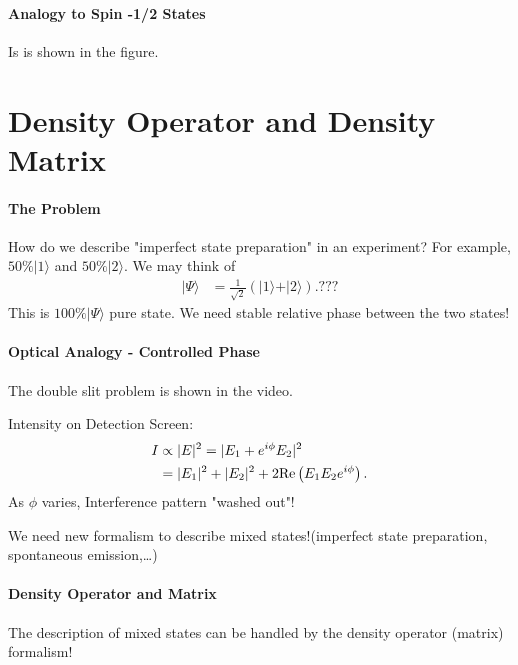 \documentclass[../../note.tex]{subfiles}
\begin{document}
\paragraph{Analogy to Spin -1/2 States}
Is is shown in the figure.

\section{Density Operator and Density Matrix}
\paragraph{The Problem}
How do we describe "imperfect state preparation" in an experiment? For example, $50 \% \vert 1 \rangle$ and $50 \% \vert 2 \rangle$. We may think of 
\begin{align}
    \vert \Psi \rangle 
    &= \frac{1}{\sqrt{2}} \left(\vert 1 \rangle + \vert 2 \rangle \right). ???
\end{align}
This is $100 \% \vert \Psi \rangle$ pure state. We need stable relative phase between the two states!

\paragraph{Optical Analogy - Controlled Phase}
The double slit problem is shown in the video.

Intensity on Detection Screen:
\begin{align}
    I 
    &\propto \vert E \vert^2 = \vert E_1 + e^{i \phi} E_2 \vert^2 \\
    &= \vert E_1 \vert^2 + \vert E_2 \vert^2 + 2 {\rm Re}\left(E_1 E_2 e^{i \phi}\right).
\end{align}
As $\phi$ varies, Interference pattern "washed out"!

We need new formalism to describe mixed states!(imperfect state preparation, spontaneous emission,\dots)

\paragraph{Density Operator and Matrix}
The description of mixed states can be handled by the density operator (matrix) formalism!
\end{document}
